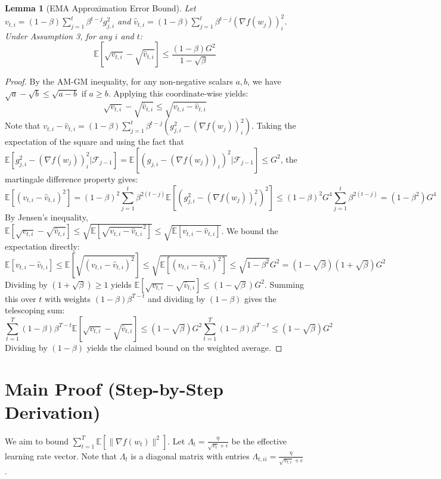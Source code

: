 \documentclass{article}
\newtheorem{lemma}[theorem]{Lemma}
\begin{document}
\begin{lemma}[EMA Approximation Error Bound]
Let $v_{t,i} = (1-\beta)\sum_{j=1}^t \beta^{t-j} g_{j,i}^2$ and $\hat{v}_{t,i} = (1-\beta)\sum_{j=1}^t \beta^{t-j} (\nabla f(w_j))_i^2$. Under Assumption 3, for any $i$ and $t$:
$$ \mathbb{E}\left[\sqrt{v_{t,i}} - \sqrt{\hat{v}_{t,i}}\right] \leq \frac{(1-\beta)G^2}{1-\sqrt{\beta}} $$
\end{lemma}
\begin{proof}
By the AM-GM inequality, for any non-negative scalars $a, b$, we have $\sqrt{a} - \sqrt{b} \leq \sqrt{a - b}$ if $a \geq b$. Applying this coordinate-wise yields:
$$ \sqrt{v_{t,i}} - \sqrt{\hat{v}_{t,i}} \leq \sqrt{v_{t,i} - \hat{v}_{t,i}} $$
Note that $v_{t,i} - \hat{v}_{t,i} = (1-\beta)\sum_{j=1}^t \beta^{t-j} (g_{j,i}^2 - (\nabla f(w_j))_i^2)$. Taking the expectation of the square and using the fact that $\mathbb{E}[g_{j,i}^2 - (\nabla f(w_j))_i^2 | \mathcal{F}_{j-1}] = \mathbb{E}[(g_{j,i} - (\nabla f(w_j))_i)^2 | \mathcal{F}_{j-1}] \leq G^2$, the martingale difference property gives:
$$ \mathbb{E}[(v_{t,i} - \hat{v}_{t,i})^2] = (1-\beta)^2 \sum_{j=1}^t \beta^{2(t-j)} \mathbb{E}[(g_{j,i}^2 - (\nabla f(w_j))_i^2)^2] \leq (1-\beta)^2 G^4 \sum_{j=1}^t \beta^{2(t-j)} = (1-\beta^2) G^4 $$
By Jensen's inequality, $\mathbb{E}[\sqrt{v_{t,i}} - \sqrt{\hat{v}_{t,i}}] \leq \sqrt{\mathbb{E}[\sqrt{v_{t,i} - \hat{v}_{t,i}}^2]} \leq \sqrt{\mathbb{E}[v_{t,i} - \hat{v}_{t,i}]}$. We bound the expectation directly:
$$ \mathbb{E}[v_{t,i} - \hat{v}_{t,i}] \leq \mathbb{E}[\sqrt{(v_{t,i} - \hat{v}_{t,i})^2}] \leq \sqrt{\mathbb{E}[(v_{t,i} - \hat{v}_{t,i})^2]} \leq \sqrt{1-\beta^2} G^2 = (1-\sqrt{\beta})(1+\sqrt{\beta}) G^2 $$
Dividing by $(1+\sqrt{\beta}) \geq 1$ yields $\mathbb{E}[\sqrt{v_{t,i}} - \sqrt{\hat{v}_{t,i}}] \leq (1-\sqrt{\beta}) G^2$. Summing this over $t$ with weights $(1-\beta)\beta^{T-t}$ and dividing by $(1-\beta)$ gives the telescoping sum:
$$ \sum_{t=1}^T (1-\beta)\beta^{T-t} \mathbb{E}[\sqrt{v_{t,i}} - \sqrt{\hat{v}_{t,i}}] \leq (1-\sqrt{\beta}) G^2 \sum_{t=1}^T (1-\beta)\beta^{T-t} \leq (1-\sqrt{\beta}) G^2 $$
Dividing by $(1-\beta)$ yields the claimed bound on the weighted average.
\end{proof}

\section*{Main Proof (Step-by-Step Derivation)}
We aim to bound $\sum_{t=1}^T \mathbb{E}[\|\nabla f(w_t)\|^2]$. Let $\Lambda_t = \frac{\eta}{\sqrt{v_t} + \epsilon}$ be the effective learning rate vector. Note that $\Lambda_t$ is a diagonal matrix with entries $\Lambda_{t,ii} = \frac{\eta}{\sqrt{v_{t,i}} + \epsilon}$.
\end{document}
